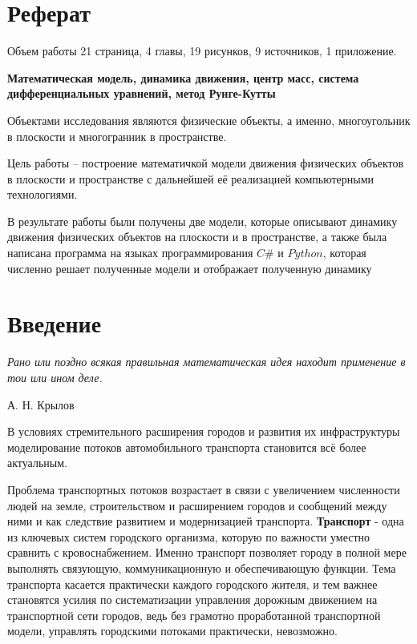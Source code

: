 \documentclass[12pt, a4paper]{extarticle}
\numberwithin{equation}{section}
\numberwithin{figure}{section}
\begin{document}
\justify 
\setlength{\parindent}{1.25cm} 
\newpage 
\thispagestyle{empty} 

\section*{Реферат}
\vspace{\baselineskip}	
Объем работы 21 страница, 4 главы, 19 рисунков, 9 источников, 1 приложение.

\textbf{Математическая модель, динамика движения, центр масс, система дифференциальных уравнений, метод Рунге-Кутты}

Объектами исследования являются физические объекты, а именно, многоугольник в плоскости и многогранник в пространстве.

Цель работы – построение математичкой модели движения физических объектов в плоскости и пространстве с дальнейшей её реализацией компьютерными технологиями.                                          

В результате работы были получены две модели, которые описывают динамику движения физических объектов на плоскости и в пространстве, а также была написана программа на языках программирования $C\#$ и $Python$, которая численно решает полученные модели и отображает полученную динамику
\newpage

\setcounter{page}{2}

\tableofcontents 
\newpage 

\section*{Введение}
\epigraph{\textit{Рано или поздно всякая правильная математическая идея находит применение в тои или ином деле.}}
{А. Н. Крылов}
В условиях стремительного расширения городов и развития их инфраструктуры моделирование потоков автомобильного транспорта становится всё более актуальным. 

Проблема транспортных потоков возрастает в связи с увеличением численности людей на земле, строительством и расширением городов и сообщений между ними и как следствие развитием и модернизацией транспорта.  \textbf{Транспорт} - одна из ключевых систем городского организма, которую по важности уместно сравнить с кровоснабжением. Именно транспорт позволяет городу в полной мере выполнять связующую, коммуникационную и обеспечивающую функции. Тема транспорта касается практически каждого городского жителя, и тем важнее становятся усилия по систематизации управления дорожным движением на транспортной сети городов, ведь без грамотно проработанной транспортной модели, управлять городскими потоками практически, невозможно. 
\end{document}
